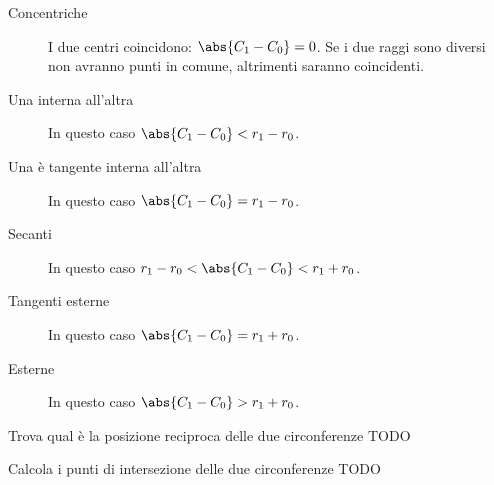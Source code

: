 \begin{description} %
 \item [Concentriche]
I due centri coincidono: \(\abs{C_1 - C_0} = 0\).
Se i due raggi sono diversi non avranno punti in comune, altrimenti saranno 
coincidenti.
 \item [Una interna all'altra]
In questo caso \(\abs{C_1 - C_0} < r_1 - r_0\).
 \item [Una è tangente interna all'altra]
In questo caso \(\abs{C_1 - C_0} = r_1 - r_0\).
 \item [Secanti]
In questo caso \(r_1 - r_0 < \abs{C_1 - C_0} < r_1 + r_0\).
 \item [Tangenti esterne]
In questo caso \(\abs{C_1 - C_0} = r_1 + r_0\).
 \item [Esterne]
In questo caso \(\abs{C_1 - C_0} > r_1 + r_0\).
\end{description}

\begin{esempio}
Trova qual è la posizione reciproca delle due circonferenze TODO
\end{esempio}

\begin{esempio}
Calcola i punti di intersezione delle due circonferenze TODO
\end{esempio}




